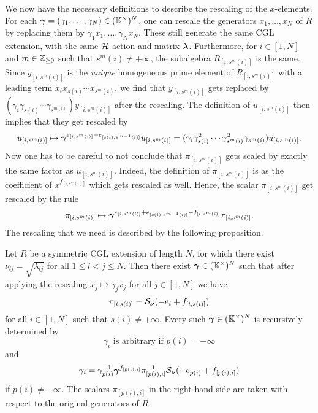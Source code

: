 We now have the necessary definitions to describe the rescaling of the $x$-elements.
For each $\boldsymbol{\gamma} = (\gamma_1, \dots, \gamma_N) \in (\mathbb{K}^\times)^N$, one can rescale the
generators $x_1, \dots, x_N$ of $R$ by replacing them by $\gamma_1 x_1, \dots, \gamma_N
	x_N$. These still generate the same CGL extension, with the same $\mathcal{H}$-action and
matrix $\boldsymbol{\lambda}$. Furthermore, for $i \in [1, N]$ and $m \in \mathbb{Z}_{\geq 0}$ such that
$s^m(i) \neq + \infty$, the subalgebra $R_{[i, s^m(i)]}$ is the same. Since $y_{[i,
					s^m(i)]}$ is the \emph{unique} homogeneous prime element of $R_{[i, s^m(i)]}$ with a
leading term $x_i x_{s(i)} \cdots x_{s^m(i)}$, we find that $y_{[i, s^m(i)]}$ gets
replaced by $(\gamma_i \gamma_{s(i)} \cdots \gamma_{s^{m(i)}})y_{[i, s^m(i)]}$ after
the rescaling. The definition of $u_{[i, s^m(i)]}$ then implies that they get rescaled
by
\begin{equation*}
	u_{[i, s^m(i)]} \mapsto \boldsymbol{\gamma}^{e_{[i, s^m(i)]} + e_{[s(i), s^{m-1}(i)]} }u_{[i, s^m(i)]} =  (\gamma_i \gamma_{s(i)}^2 \cdots \gamma_{s^m(i)}^2 \gamma_{s^m(i)})u_{[i, s^m(i)]}.
\end{equation*}
%
Now one has to be careful to not conclude that $\pi_{[i, s^m(i)]}$ gets scaled by
exactly the same factor as $u_{[i, s^m(i)]}$. Indeed, the definition of $\pi_{[i,
				s^m(i)]}$ is as the coefficient of $x^{f_{[i, s^m(i)]}}$ which gets rescaled as well.
Hence, the scalar $\pi_{[i, s^m(i)]}$ get rescaled by the rule
\begin{equation*}
	\pi_{[i, s^m(i)]} \mapsto \boldsymbol{\gamma}^{e_{[i, s^m(i)]}+e_{[s(i), s^{m-1}(i)]} - f_{[i, s^m(i)]}}\pi_{[i, s^m(i)]}.
\end{equation*}
%
The rescaling that we need is described by the following proposition.
\begin{proposition}

	Let $R$ be a symmetric CGL extension of length $N$, for which there exist $\nu_{lj} =
		\sqrt{\lambda_{lj}}$ for all $1 \leq l < j \leq N$. Then there exist $\boldsymbol{\gamma} \in
		(\mathbb{K}^\times)^N$ such that after applying the rescaling $x_j \mapsto \gamma_j x_j$ for
	all $j \in [1, N]$ we have
	\begin{equation}\label{eq:rescaling_conditions_for_pi}
		\pi_{[i, s(i)]} = \mathcal{S}_{\boldsymbol{\nu}}(-e_i + f_{[i, s(i)]})
	\end{equation}
	for all $i \in [1, N]$ such that $s(i) \neq + \infty$. Every such $\boldsymbol{\gamma} \in
		(\mathbb{K}^\times)^N$ is recursively determined by
	\begin{equation*}
		\gamma_i \text{ is arbitrary if } p(i) = -\infty
	\end{equation*}
	and
	\begin{equation*}
		\gamma_i = \gamma_{p(i)}^{-1} \boldsymbol{\gamma}^{f_{[p(i),i]}}\pi^{-1}_{[p(i), i]}\mathcal{S}_{\boldsymbol{\nu}}(-e_{p(i)} + f_{[p(i), i]})
	\end{equation*}
	if $p(i) \neq -\infty$. The scalars $\pi_{[p(i), i]}$ in the right-hand side are taken with respect to the original generators of $R$.
\end{proposition}
